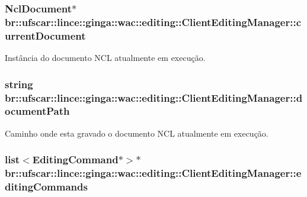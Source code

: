 \hypertarget{classbr_1_1ufscar_1_1lince_1_1ginga_1_1wac_1_1editing_1_1ClientEditingManager_a9a5b80d7a04837b9796f3ef87972d99a}{
\subsubsection[{currentDocument}]{\setlength{\rightskip}{0pt plus 5cm}NclDocument$\ast$ {\bf br::ufscar::lince::ginga::wac::editing::ClientEditingManager::currentDocument}}}
\label{classbr_1_1ufscar_1_1lince_1_1ginga_1_1wac_1_1editing_1_1ClientEditingManager_a9a5b80d7a04837b9796f3ef87972d99a}


Instância do documento NCL atualmente em execução. 

\hypertarget{classbr_1_1ufscar_1_1lince_1_1ginga_1_1wac_1_1editing_1_1ClientEditingManager_a259109a4e6e19ad1cc8b193f99140c7d}{
\subsubsection[{documentPath}]{\setlength{\rightskip}{0pt plus 5cm}string {\bf br::ufscar::lince::ginga::wac::editing::ClientEditingManager::documentPath}}}
\label{classbr_1_1ufscar_1_1lince_1_1ginga_1_1wac_1_1editing_1_1ClientEditingManager_a259109a4e6e19ad1cc8b193f99140c7d}


Caminho onde esta gravado o documento NCL atualmente em execução. 

\hypertarget{classbr_1_1ufscar_1_1lince_1_1ginga_1_1wac_1_1editing_1_1ClientEditingManager_aa89f63aad52acdd1fc2502ebe6193be8}{
\subsubsection[{editingCommands}]{\setlength{\rightskip}{0pt plus 5cm}list$<${\bf EditingCommand}$\ast$$>$$\ast$ {\bf br::ufscar::lince::ginga::wac::editing::ClientEditingManager::editingCommands}}}
\label{classbr_1_1ufscar_1_1lince_1_1ginga_1_1wac_1_1editing_1_1ClientEditingManager_aa89f63aad52acdd1fc2502ebe6193be8}


